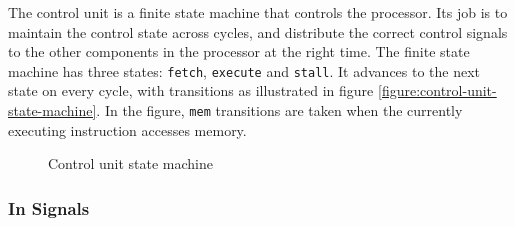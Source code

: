 The control unit is a finite state machine that controls the processor.
Its job is to maintain the control state across cycles, and distribute the correct control signals to the other components in the processor at the right time.
The finite state machine has three states: \texttt{fetch}, \texttt{execute} and \texttt{stall}.
It advances to the next state on every cycle, with transitions as illustrated in figure \vref{figure:control-unit-state-machine}.
In the figure, \texttt{mem} transitions are taken when the currently executing instruction accesses memory.

\begin{figure}[h]
    \begin{center}
            \caption{Control unit state machine}
            \label{figure:control-unit-state-machine}
    \end{center}
\end{figure}

\subsubsection{In Signals}

